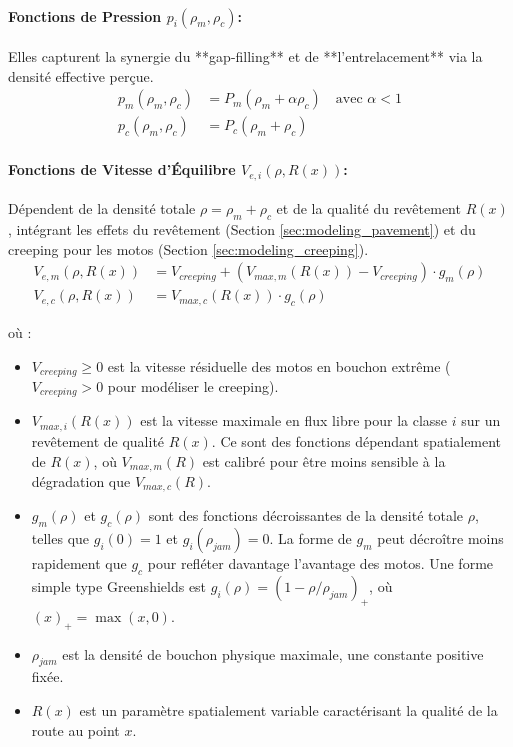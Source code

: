 \paragraph{Fonctions de Pression \( p_i(\rho_m, \rho_c) \):}
Elles capturent la synergie du **gap-filling** et de **l'entrelacement** via la densité effective perçue.
\begin{align}
    p_m(\rho_m, \rho_c) &= P_m(\rho_m + \alpha \rho_c) \quad \text{avec } \alpha < 1 \\
    p_c(\rho_m, \rho_c) &= P_c(\rho_m + \rho_c)
\end{align}


\paragraph{Fonctions de Vitesse d'Équilibre \( V_{e,i}(\rho, R(x)) \):}
Dépendent de la densité totale \( \rho = \rho_m + \rho_c \) et de la qualité du revêtement \( R(x) \), intégrant les effets du revêtement (Section \ref{sec:modeling_pavement}) et du creeping pour les motos (Section \ref{sec:modeling_creeping}).
\begin{align}
    V_{e,m}(\rho, R(x)) &= V_{creeping} + \left(V_{max,m}(R(x)) - V_{creeping}\right) \cdot g_m(\rho) \\
    V_{e,c}(\rho, R(x)) &= V_{max,c}(R(x)) \cdot g_c(\rho)
\end{align}




où :
\begin{itemize}
    \item \( V_{creeping} \ge 0 \) est la vitesse résiduelle des motos en bouchon extrême (\( V_{creeping} > 0 \) pour modéliser le creeping).
    \item \( V_{max,i}(R(x)) \) est la vitesse maximale en flux libre pour la classe \( i \) sur un revêtement de qualité \( R(x) \). Ce sont des fonctions dépendant spatialement de \( R(x) \), où \( V_{max,m}(R) \) est calibré pour être moins sensible à la dégradation que \( V_{max,c}(R) \).
    \item \( g_m(\rho) \) et \( g_c(\rho) \) sont des fonctions décroissantes de la densité totale \( \rho \), telles que \( g_i(0)=1 \) et \( g_i(\rho_{jam})=0 \). La forme de \( g_m \) peut décroître moins rapidement que \( g_c \) pour refléter davantage l'avantage des motos. Une forme simple type Greenshields est \(g_i(\rho) = (1 - \rho / \rho_{jam})_+\), où \( (x)_+ = \max(x, 0) \).
    \item \( \rho_{jam} \) est la densité de bouchon physique maximale, une constante positive fixée.
    \item \( R(x) \) est un paramètre spatialement variable caractérisant la qualité de la route au point \( x \).
\end{itemize}

